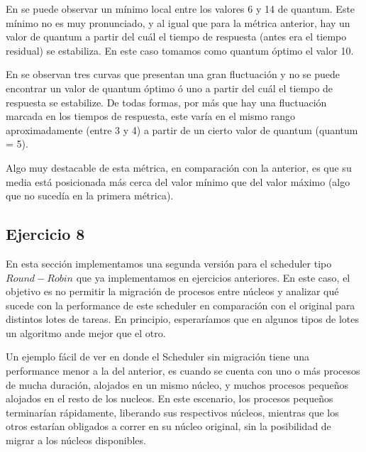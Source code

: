 \documentclass[11pt, a4paper, twoside]{article}
\begin{document}
En  se puede observar un mínimo local entre los valores 6 y 14 de quantum. Este 
mínimo no es muy pronunciado, y al igual que para la métrica anterior, hay un valor de quantum a partir
del cuál el tiempo de respuesta (antes era el tiempo residual) se estabiliza. En este caso tomamos como
quantum óptimo el valor 10. 

En  se observan tres curvas que presentan una gran fluctuación y no se puede 
encontrar un valor de quantum óptimo ó uno a partir del cuál el tiempo de respuesta se estabilize. De todas 
formas, por más que hay una fluctuación marcada en los tiempos de respuesta, este varía en el mismo rango
aproximadamente (entre 3 y 4) a partir de un cierto valor de quantum (quantum = 5). 

Algo muy destacable de esta métrica, en comparación con la anterior, es que su media está posicionada más
cerca del valor mínimo que del valor máximo (algo que no sucedía en la primera métrica).



\clearpage
\subsection{Ejercicio 8}
En esta sección implementamos una segunda versión para el scheduler tipo $Round-Robin$ que ya implementamos
en ejercicios anteriores. En este caso, el objetivo es no permitir la migración de procesos entre núcleos y
analizar qué sucede con la performance de este scheduler en comparación con el original para distintos lotes
de tareas. En principio, esperaríamos que en algunos tipos de lotes un algoritmo ande mejor que el otro.

Un ejemplo fácil de ver en donde el Scheduler sin migración tiene una performance menor a la del anterior,
es cuando se cuenta con uno o más procesos de mucha duración, alojados en un mismo núcleo, y muchos procesos
pequeños alojados en el resto de los nucleos. En este escenario, los procesos pequeños terminarían rápidamente,
liberando sus respectivos núcleos, mientras que los otros estarían obligados a correr en su núcleo original, 
sin la posibilidad de migrar a los núcleos disponibles. 
\end{document}

